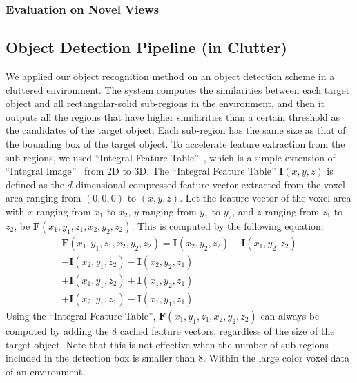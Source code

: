 \documentclass[conference]{sty/IEEEtran}
\begin{document}
\subsubsection{Evaluation on Novel Views}

\subsection{Object Detection Pipeline (in Clutter)}
\label{sec:recognition}
We applied our object recognition method on an object detection scheme in a cluttered environment.
The system computes the similarities between each target object and all rectangular-solid sub-regions in the environment, and then it outputs all the regions that have higher similarities than a certain threshold as the candidates of the target object.
Each sub-region has the same size as that of the bounding box of the target object.
To accelerate feature extraction from the sub-regions, we used ``Integral Feature Table''~\cite{kanezaki2010tvc}, which is a simple extension of ``Integral Image''~\cite{viola2001} from 2D to 3D.
The ``Integral Feature Table'' $\bm{I}(x,y,z)$ is defined as the $d$-dimensional compressed feature vector extracted from the voxel area
    ranging from $(0,0,0)$ to $(x,y,z)$.
Let the feature vector of the voxel area with $x$ ranging from $x_1$ to $x_2$,
    $y$ ranging from $y_1$ to $y_2$, and $z$ ranging from $z_1$ to $z_2$, be $\bm{F}(x_1,y_1,z_1,x_2,y_2,z_2)$.
This is computed by the following equation:
\begin{eqnarray*}\label{eq:sat}
\bm{F}(x_1,y_1,z_1,x_2,y_2,z_2) = \bm{I}(x_2,y_2,z_2) - \bm{I}(x_1,y_2,z_2)
                           \\ - \bm{I}(x_2,y_1,z_2) - \bm{I}(x_2,y_2,z_1)
                           \\ + \bm{I}(x_1,y_1,z_2) + \bm{I}(x_1,y_2,z_1)
                           \\ + \bm{I}(x_2,y_1,z_1) - \bm{I}(x_1,y_1,z_1)
\end{eqnarray*}
Using the ``Integral Feature Table'', $\bm{F}(x_1,y_1,z_1,x_2,y_2,z_2)$ can always be computed by adding the 8 cached feature vectors,
    regardless of the size of the target object.
Note that this is not effective when the number of sub-regions included in the detection box is smaller than 8.
Within the large color voxel data of an environment,
\end{document}
